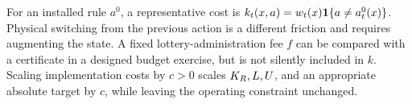 For an installed rule $a^0$, a representative cost is $k_t(x,a)=w_t(x)\mathbf 1\{a\ne a_t^0(x)\}$. Physical switching from the previous action is a different friction and requires augmenting the state. A fixed lottery-administration fee $f$ can be compared with a certificate in a designed budget exercise, but is not silently included in $k$. Scaling implementation costs by $c>0$ scales $K_R,L,U$, and an appropriate absolute target by $c$, while leaving the operating constraint unchanged.
